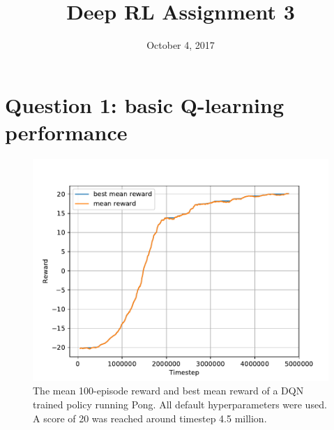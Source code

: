 \documentclass{mwhittaker}
\title{Deep RL Assignment 3}
\date{October 4, 2017}
\begin{document}
\maketitle

\section*{Question 1: basic Q-learning performance}
\begin{figure}[h]
  \centering
  \includegraphics[width=\textwidth]{q1.pdf}
  \caption{%
    The mean 100-episode reward and best mean reward of a DQN trained policy
    running Pong. All default hyperparameters were used. A score of 20 was
    reached around timestep 4.5 million.
  }\label{fig:q1}
\end{figure}

\clearpage
\end{document}
